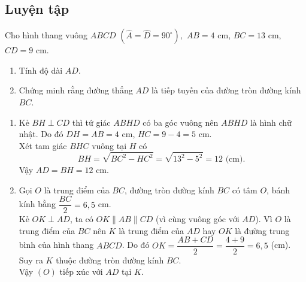 \subsection{Luyện tập}
\begin{bt}
Cho hình thang vuông $ABCD$ $(\widehat{A}=\widehat{D}=90^{\circ}),$ $AB=4$ cm, $BC=13$ cm, $CD=9$ cm.
\begin{enumerate}
\item Tính độ dài $AD.$
\item Chứng minh rằng đường thẳng $AD$ là tiếp tuyến của đường tròn đường kính $BC$.
\end{enumerate}
\loigiai
{
\begin{center}
\end{center}
\begin{enumerate}
\item Kẻ $BH \perp CD$ thì tứ giác $ABHD$ có ba góc vuông nên $ABHD$ là hình chữ nhật. Do đó $DH=AB=4$ cm, $HC=9-4=5$ cm.\\
Xét tam giác $BHC$ vuông tại $H$ có
$$BH=\sqrt{BC^2-HC^2}=\sqrt{13^2-5^2}=12 \text{ (cm). }$$
Vậy $AD=BH=12$ cm.
\item Gọi $O$ là trung điểm của $BC$, đường tròn đường kính $BC$ có tâm $O$, bánh kính bằng $\dfrac{BC}{2}=6{,}5$ cm.\\
Kẻ $OK \perp AD$, ta có $OK\parallel AB \parallel CD$ (vì cùng vuông góc với $AD$). Vì $O$ là trung điểm của $BC$ nên $K$ là trung điểm của $AD$ hay $OK$ là đường trung bình của hình thang $ABCD$. Do đó
$OK=\dfrac{AB+CD}{2}=\dfrac{4+9}{2}=6{,}5$ (cm).\\
Suy ra $K$ thuộc đường tròn đường kính $BC$.\\
Vậy $(O)$ tiếp xúc với $AD$ tại $K$.
\end{enumerate}
}
\end{bt}

